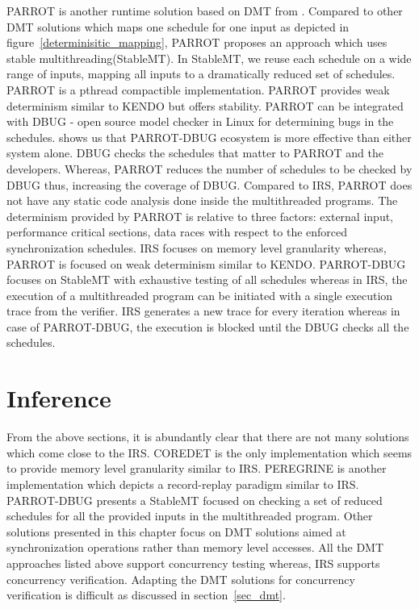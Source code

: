 PARROT is another runtime solution based on DMT from \citet{parrot}. 
Compared to other DMT solutions which maps one schedule for one input as depicted in figure~\ref{determinisitic_mapping}, PARROT proposes an approach which uses stable multithreading(StableMT). 
In StableMT, we reuse each schedule on a wide range of inputs, mapping all inputs to a dramatically reduced set of schedules. 
PARROT is a pthread compactible implementation. 
PARROT provides weak determinism similar to KENDO but offers stability. 
PARROT can be integrated with DBUG\citep{dbug} - open source model checker in Linux for determining bugs in the schedules. 
\citet{parrot} shows us that PARROT-DBUG ecosystem is more effective than either system alone. 
DBUG checks the schedules that matter to PARROT and the developers. 
Whereas, PARROT reduces the number of schedules to be checked by DBUG thus, increasing the coverage of DBUG. 
Compared to IRS, PARROT does not have any static code analysis done inside the multithreaded programs. 
The determinism provided by PARROT is relative to three factors: external input, performance critical sections, data races with respect to the enforced synchronization schedules. 
IRS focuses on memory level granularity whereas, PARROT is focused on weak determinism similar to KENDO. 
PARROT-DBUG focuses on StableMT with exhaustive testing of all schedules whereas in IRS, the execution of a multithreaded program can be initiated with a single execution trace from the verifier. 
IRS generates a new trace for every iteration whereas in case of PARROT-DBUG, the execution is blocked until the DBUG checks all the schedules.

\section*{Inference}

From the above sections, it is abundantly clear that there are not many solutions which come close to the IRS. 
COREDET is the only implementation which seems to provide memory level granularity similar to IRS. 
PEREGRINE is another implementation which depicts a record-replay paradigm similar to IRS. 
PARROT-DBUG presents a StableMT focused on checking a set of reduced schedules for all the provided inputs in the multithreaded program. 
Other solutions presented in this chapter focus on DMT solutions aimed at synchronization operations rather than memory level accesses. 
All the DMT approaches listed above support concurrency testing whereas, IRS supports concurrency verification. 
Adapting the DMT solutions for concurrency verification is difficult as discussed in section~\ref{sec_dmt}.

